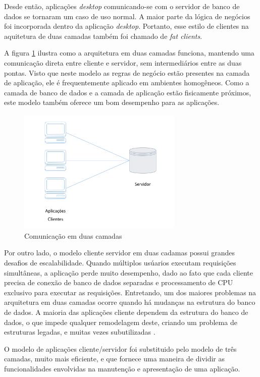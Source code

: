 Desde então, aplicações \textit{desktop} comunicando-se com o servidor de banco de dados se tornaram um caso de uso normal. A maior parte da lógica de negócios foi incorporada dentro da aplicação \textit{desktop}. Portanto, esse estilo de clientes na aquitetura de duas camadas também foi chamado de \textit{fat clients}.

A figura \ref{fig:two-tier} ilustra como a arquitetura em duas camadas funciona, mantendo uma comunicação direta entre cliente e servidor, sem intermediários entre as duas pontas. Visto que neste modelo as regras de negócio estão presentes na camada de aplicação, ele é frequentemente aplicado em ambientes homogêneos. Como a camada de banco de dados e a camada de aplicação estão fisicamente próximos, este modelo também oferece um bom desempenho para as aplicações.

\begin{figure}[htbp]
    \centering
    \includegraphics[width=0.7\textwidth]{figuras/client-server.png}
    \caption{Comunicação em duas camadas}
    \label{fig:two-tier}
\end{figure}

Por outro lado, o modelo cliente servidor em duas cadamas possui grandes desafios de escalabilidade. Quando múltiplos usúarios executam requisições simultâneas, a aplicação perde muito desempenho, dado ao fato que cada cliente precisa de conexão de banco de dados separadas e processamento de CPU exclusivo para executar as requisições. Entretando, um dos maiores problemas na arquitetura em duas camadas ocorre quando há mudanças na estrutura do banco de dados. A maioria das aplicações cliente dependem da estrutura do banco de dados, o que impede qualquer remodelagem deste, criando um problema de estruturas legadas, e muitas vezes subutilizadas \cite{two-tier-differences}.

O modelo de aplicações cliente/servidor foi substituido pelo modelo de três camadas, muito mais eficiente, e que fornece uma maneira de dividir as funcionalidades envolvidas na manutenção e apresentação de uma aplicação.

